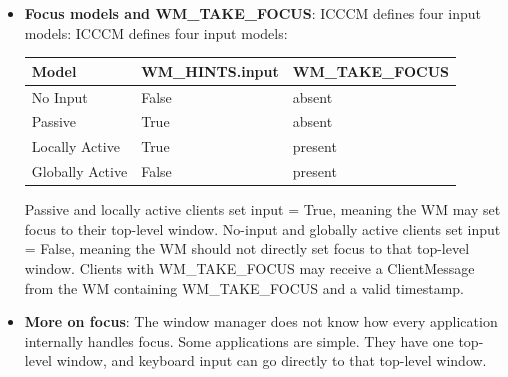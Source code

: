 \documentclass{report}
\begin{document}
\begin{itemize}
\begin{itemize}
                \item \textbf{WindowGroupHint:} window\_group is valid. Associates this window with a group of related windows, often belonging to the same logical application.
                \item \textbf{UrgencyHint:} the client is requesting the user's attention. For a tiling WM, this commonly maps to an “urgent” workspace/window indicator.
            \end{itemize}
            For a modern tiling WM, the most relevant ones are usually:
            \bigbreak \noindent 
            \begin{cppcode}
                InputHint
                WindowGroupHint
                UrgencyHint
            \end{cppcode}
        \item \textbf{Focus models and WM\_TAKE\_FOCUS}: ICCCM defines four input models:
            \bigbreak \noindent 
            ICCCM defines four input models:
            \begin{center}
                \begin{tabularx}{\textwidth}{@{}Xll@{}}
                    \toprule
                    \textbf{Model}&	\textbf{WM\_HINTS.input}&	\textbf{WM\_TAKE\_FOCUS} \\
                    \midrule
                    No Input&	False	&absent\\[2ex]
                    Passive	&True	&absent\\[2ex]
                    Locally Active	&True	&present\\[2ex]
                    Globally Active	&False	&present\\
                    \bottomrule
                \end{tabularx}
            \end{center}
            Passive and locally active clients set input = True, meaning the WM may set focus to their top-level window. No-input and globally active clients set input = False, meaning the WM should not directly set focus to that top-level window. Clients with WM\_TAKE\_FOCUS may receive a ClientMessage from the WM containing WM\_TAKE\_FOCUS and a valid timestamp.
        \item \textbf{More on focus}: The window manager does not know how every application internally handles focus.
            \bigbreak \noindent 
            Some applications are simple. They have one top-level window, and keyboard input can go directly to that top-level window.

\end{itemize}
\end{document}
